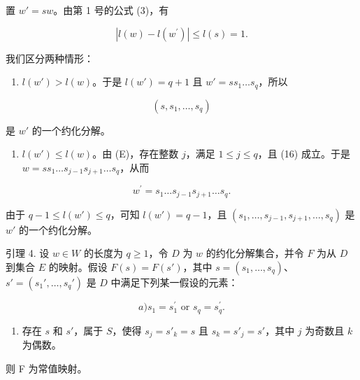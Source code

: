 置 \(w' = sw\)。由第 1 号的公式 (3)，有

\[
\left| l (w) - l \left(w ^ {\prime}\right) \right| \leqslant l (s) = 1.
\]

我们区分两种情形：

\begin{enumerate}
\def\labelenumi{\alph{enumi})}
\tightlist
\item
  \(l(w') > l(w)\)。于是 \(l(w') = q + 1\) 且 \(w' = ss_1 \ldots s_q\)，所以
\end{enumerate}

\[
\left(s, s _ {1}, \ldots , s _ {q}\right)
\]

是 \(w'\) 的一个约化分解。

\begin{enumerate}
\def\labelenumi{\alph{enumi})}
\setcounter{enumi}{1}
\tightlist
\item
  \(l(w') \leqslant l(w)\)。由 (E)，存在整数 \(j\)，满足 \(1 \leqslant j \leqslant q\)，且 (16) 成立。于是 \(w = ss_1 \ldots s_{j-1}s_{j+1} \ldots s_q\)，从而
\end{enumerate}

\[
w ^ {\prime} = s _ {1} \dots s _ {j - 1} s _ {j + 1} \dots s _ {q}.
\]

由于 \(q - 1 \leqslant l(w') \leqslant q\)，可知 \(l(w') = q - 1\)，且 \((s_1, \ldots, s_{j-1}, s_{j+1}, \ldots, s_q)\) 是 \(w'\) 的一个约化分解。

引理 4. 设 \(w \in W\) 的长度为 \(q \geqslant 1\)，令 \(D\) 为 \(w\) 的约化分解集合，并令 \(F\) 为从 \(D\) 到集合 \(E\) 的映射。假设 \(F(s) = F(s')\)，其中 \(s = (s_1, \ldots, s_q)\)、\(s' = (s_1', \ldots, s_q')\) 是 \(D\) 中满足下列某一假设的元素：

\[
a) s _ {1} = s _ {1} ^ {\prime} \text {   or   } s _ {q} = s _ {q} ^ {\prime}.
\]

\begin{enumerate}
\def\labelenumi{\alph{enumi})}
\setcounter{enumi}{1}
\tightlist
\item
  存在 \(s\) 和 \(s'\)，属于 \(S\)，使得 \(s_j = s'_k = s\) 且 \(s_k = s'_j = s'\)，其中 \(j\) 为奇数且 \(k\) 为偶数。
\end{enumerate}

则 F 为常值映射。

